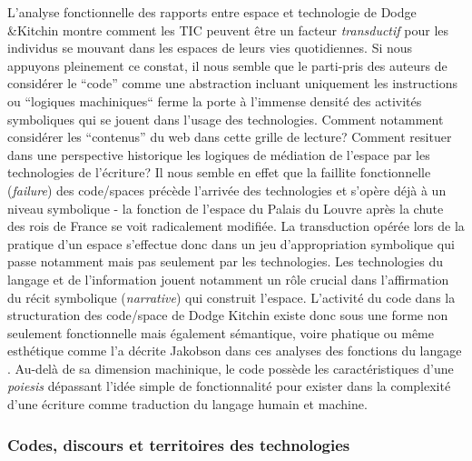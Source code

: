 L’analyse fonctionnelle des rapports entre espace et technologie de Dodge \&Kitchin montre comment les TIC peuvent être un facteur \textit{transductif} pour les individus se mouvant dans les espaces de leurs vies quotidiennes. Si nous appuyons pleinement ce constat, il nous semble que le parti-pris des auteurs de considérer le “code” comme une abstraction incluant uniquement les instructions ou “logiques machiniques“ ferme la porte à l’immense densité des activités symboliques qui se jouent dans l’usage des technologies. Comment notamment considérer les “contenus” du web dans cette grille de lecture? Comment resituer dans une perspective historique les logiques de médiation de l’espace par les technologies de l’écriture? Il nous semble en effet que la faillite fonctionnelle (\textit{failure}) des code/spaces précède l’arrivée des technologies et s’opère déjà à un niveau symbolique - la fonction de l’espace du Palais du Louvre après la chute des rois de France se voit radicalement modifiée. La transduction opérée lors de la pratique d’un espace s’effectue donc dans un jeu d’appropriation symbolique qui passe notamment mais pas seulement par les technologies. Les technologies du langage et de l’information jouent notamment un rôle crucial dans l’affirmation du récit symbolique (\textit{narrative}) qui construit l’espace. L’activité du code dans la structuration des code/space de Dodge  Kitchin existe donc sous une forme non seulement fonctionnelle mais également sémantique, voire phatique ou même esthétique comme l’a décrite Jakobson dans ces analyses des fonctions du langage \citep{Jakobson1956}. Au-delà de sa dimension machinique, le code possède les caractéristiques d’une \textit{poiesis} dépassant l’idée simple de fonctionnalité pour exister dans la complexité d’une écriture comme traduction du langage humain et machine.

\subsubsection[Codes, discours et territoires des technologies]{Codes, discours et territoires des technologies}

